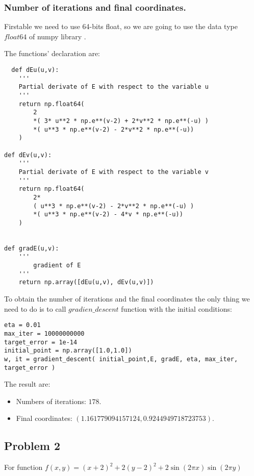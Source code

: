 \subsubsection{Number of iterations and final coordinates.}

Firstable we need to use 64-bits float, so we are going to use the data type $float64$ of numpy library \cite{float64}.

The functions' declaration are:

\begin{verbatim}
  def dEu(u,v):
    '''
    Partial derivate of E with respect to the variable u
    '''
    return np.float64(
        2
        *( 3* u**2 * np.e**(v-2) + 2*v**2 * np.e**(-u) )
        *( u**3 * np.e**(v-2) - 2*v**2 * np.e**(-u))
    )
    
def dEv(u,v):
    '''
    Partial derivate of E with respect to the variable v
    '''
    return np.float64(
        2*
        ( u**3 * np.e**(v-2) - 2*v**2 * np.e**(-u) )
        *( u**3 * np.e**(v-2) - 4*v * np.e**(-u))
    )


def gradE(u,v):
    ''' 
        gradient of E
    '''
    return np.array([dEu(u,v), dEv(u,v)])

\end{verbatim}

To obtain the number of iterations and the final coordinates the only thing we need to do is to call $gradien\_descent$ function with the initial conditions:

\begin{verbatim}
eta = 0.01 
max_iter = 10000000000
target_error = 1e-14
initial_point = np.array([1.0,1.0])
w, it = gradient_descent( initial_point,E, gradE, eta, max_iter, target_error )
\end{verbatim}

The result are:

\begin{itemize}
\item Numbers of iterations: $178.$
\item Final coordinates: $( 1.161779094157124 ,  0.9244949718723753 ).$
\end{itemize}


\subsection{Problem 2}


For function $f(x,y) = (x+2)^2 + 2(y-2)^2 + 2 \sin (2 \pi x) \sin (2 \pi y)$

